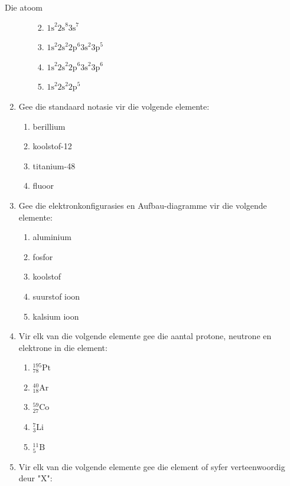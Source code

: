 \begin{eocexercises}{Die atoom}
\begin{enumerate}[noitemsep, label=\textbf{\arabic*}. ]
\begin{enumerate}[noitemsep, label=\textbf{\alph*}. ]
\begin{enumerate}[noitemsep, label=\textbf{\alph*}. ]
            \label{m38741*uid218}\item  ${1\text{s}}^{2}{2\text{s}}^{8}{3\text{s}}^{7}$\label{m38741*uid219}\item 
${1\text{s}}^{2}{2\text{s}}^{2}{2\text{p}}^{6}{3\text{s}}^{2}{3\text{p}}^{5}$
\label{m38741*uid220}\item 
${1\text{s}}^{2}{2\text{s}}^{2}{2\text{p}}^{6}{3\text{s}}^{2}{3\text{p}}^{6}$\label{m38741*uid221}\item 
${1\text{s}}^{2}{2\text{s}}^{2}{2\text{p}}^{5}$\end{enumerate}
                \end{enumerate}
        \item Gee die standaard notasie vir die volgende elemente:
\label{m38741*id8223}\begin{enumerate}[noitemsep, label=\textbf{\alph*}. ] 
            \item berillium
\item koolstof-12
\item titanium-48
\item fluoor
\end{enumerate}
\item Gee die elektronkonfigurasies en Aufbau-diagramme vir die volgende elemente:\label{m38741*id7624}\begin{enumerate}[noitemsep, label=\textbf{\alph*}. ] 
            \item aluminium
\item fosfor
\item koolstof
\item suurstof ioon
\item kalsium ioon
\end{enumerate}
\item Vir elk van die volgende elemente gee die aantal protone, neutrone en elektrone in die element: \label{m38741*id74374}\begin{enumerate}[noitemsep, label=\textbf{\alph*}. ] 
            \item $_{78}^{195}\text{Pt}$
\item $_{18}^{40}\text{Ar}$
\item $_{27}^{59}\text{Co}$
\item $_{3}^{7}\text{Li}$
\item $_{5}^{11}\text{B}$
\end{enumerate}
\item Vir elk van die volgende elemente gee die element of syfer verteenwoordig deur "X": \label{m38741*id7434324}\begin{enumerate}[noitemsep, label=\textbf{\alph*}. ] 

\end{enumerate}
\end{enumerate}
\end{eocexercises}
